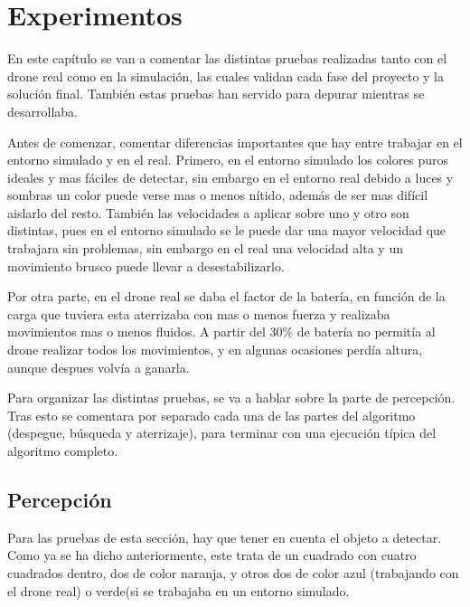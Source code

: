 \chapter{Experimentos}\label{cap.experimentos}
\hspace{1cm} En este cap\'itulo se van a comentar las distintas pruebas realizadas tanto con el drone real como en la simulaci\'on, las cuales validan cada fase del proyecto y la soluci\'on final. Tambi\'en estas pruebas han servido para depurar mientras se desarrollaba. 

\hspace{1cm} Antes de comenzar, comentar diferencias importantes que hay entre trabajar en el entorno simulado y en el real. Primero, en el entorno simulado los colores puros ideales y mas f\'aciles de detectar, sin embargo en el entorno real debido a luces y sombras un color puede verse mas o menos n\'itido, adem\'as de ser mas dif\'icil aislarlo del resto. Tambi\'en las velocidades a aplicar sobre uno y otro son distintas, pues en el entorno simulado se le puede dar una mayor velocidad que trabajara sin problemas, sin embargo en el real una velocidad alta y un movimiento brusco puede llevar a desestabilizarlo. 

\hspace{1cm} Por otra parte, en el drone real se daba el factor de la bater\'ia, en funci\'on de la carga que tuviera esta aterrizaba con mas o menos fuerza y realizaba movimientos mas o menos fluidos. A partir del 30\% de bater\'ia no permit\'ia al drone realizar todos los movimientos, y en algunas ocasiones perd\'ia altura, aunque despues volv\'ia a ganarla. 

\hspace{1cm} Para organizar las distintas pruebas,  se va a hablar sobre la parte de percepci\'on. Tras esto se comentara por separado cada una de las partes del algoritmo (despegue, b\'usqueda y aterrizaje), para terminar con una ejecuci\'on t\'ipica del algoritmo completo.

\section{Percepci\'on }

\hspace{1cm} Para las pruebas de esta secci\'on, hay que tener en cuenta el objeto a detectar. Como ya se ha dicho anteriormente, este trata de un cuadrado con cuatro cuadrados dentro, dos de color naranja, y otros dos de color azul (trabajando con el drone real) o verde(si se trabajaba en un entorno simulado. 

